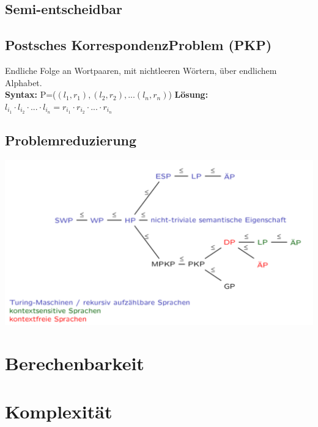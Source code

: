 \documentclass[12pt,a4paper]{article}
\begin{document}
	\subsection{Semi-entscheidbar}

	\subsection{Postsches KorrespondenzProblem (PKP)}
		Endliche Folge an Wortpaaren, mit nichtleeren Wörtern, über endlichem Alphabet.\\
		\textbf{Syntax:} P=($(l_1, r_1), (l_2, r_2), ...(l_n, r_n)$) \hfill \textbf{Lösung:} $l_{i_1} \cdot l_{i_2} \cdot ... \cdot l_{i_n} = r_{i_1} \cdot r_{i_2} \cdot ... \cdot r_{i_n}$
	
	\subsection{Problemreduzierung}
		\includegraphics[scale=0.4]{Bilder/Zusammenfassung_Unentscheidbarkeiten.png}

\section{Berechenbarkeit}

\section{Komplexität}
\end{document}
